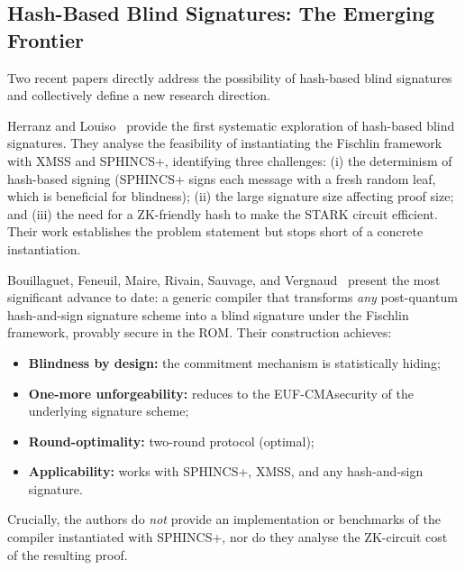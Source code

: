 \documentclass[11pt,a4paper]{article}
\newcommand{\ROM}{\textsf{ROM}}
\newcommand{\EUFCMA}{\textsf{EUF-CMA}}
\begin{document}
\subsection{Hash-Based Blind Signatures: The Emerging Frontier}

Two recent papers directly address the possibility of hash-based blind signatures and
collectively define a new research direction.

Herranz and Louiso~\cite{Herranz2025HashBased} provide the first systematic exploration of
hash-based blind signatures.  They analyse the feasibility of instantiating the Fischlin
framework with XMSS and SPHINCS+, identifying three challenges: (i) the determinism of
hash-based signing (SPHINCS+ signs each message with a fresh random leaf, which is beneficial
for blindness); (ii) the large signature size affecting proof size; and (iii) the need for a
ZK-friendly hash to make the STARK circuit efficient.  Their work establishes the problem
statement but stops short of a concrete instantiation.

Bouillaguet, Feneuil, Maire, Rivain, Sauvage, and Vergnaud~\cite{Bouillaguet2026BlindingPH}
present the most significant advance to date: a generic compiler that transforms \emph{any}
post-quantum hash-and-sign signature scheme into a blind signature under the Fischlin framework,
provably secure in the \ROM.  Their construction achieves:
\begin{itemize}
  \item \textbf{Blindness by design:} the commitment mechanism is statistically hiding;
  \item \textbf{One-more unforgeability:} reduces to the \EUFCMA security of the underlying
        signature scheme;
  \item \textbf{Round-optimality:} two-round protocol (optimal);
  \item \textbf{Applicability:} works with SPHINCS+, XMSS, and any hash-and-sign signature.
\end{itemize}
Crucially, the authors do \emph{not} provide an implementation or benchmarks of the compiler
instantiated with SPHINCS+, nor do they analyse the ZK-circuit cost of the resulting proof.

\end{document}
